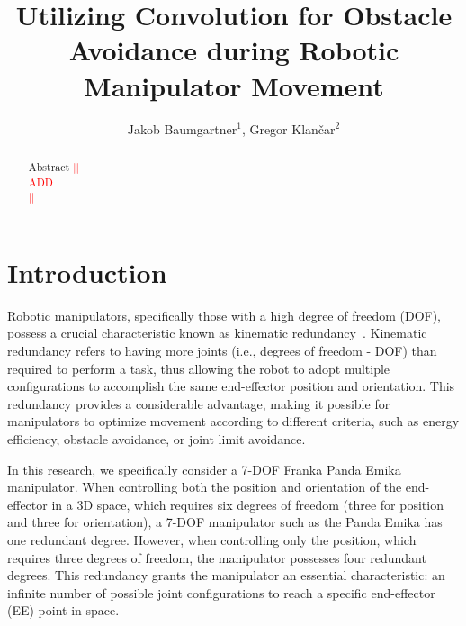 \documentclass[a4paper]{article}
\newcommand\todocomment[1]{\textcolor{red}{||\\ #1\\||}}
\begin{document}
\title{Utilizing Convolution for Obstacle Avoidance during Robotic Manipulator Movement}

\author{Jakob Baumgartner$^{1}$, Gregor Klančar$^{2}$} %



\maketitle


\begin{abstract}{Abstract}
\todocomment{ADD}
\end{abstract}



\section{Introduction }

Robotic manipulators, specifically those with a high degree of freedom (DOF), possess a crucial characteristic known as kinematic redundancy~\cite{Nguyen1991}. Kinematic redundancy refers to having more joints (i.e., degrees of freedom - DOF) than required to perform a task, thus allowing the robot to adopt multiple configurations to accomplish the same end-effector position and orientation. This redundancy provides a considerable advantage, making it possible for manipulators to optimize movement according to different criteria, such as energy efficiency, obstacle avoidance, or joint limit avoidance.

In this research, we specifically consider a 7-DOF Franka Panda Emika~\cite{Franka2021} manipulator. When controlling both the position and orientation of the end-effector in a 3D space, which requires six degrees of freedom (three for position and three for orientation), a 7-DOF manipulator such as the Panda Emika has one redundant degree. However, when controlling only the position, which requires three degrees of freedom, the manipulator possesses four redundant degrees. This redundancy grants the manipulator an essential characteristic: an infinite number of possible joint configurations to reach a specific end-effector (EE) point in space.
\end{document}
